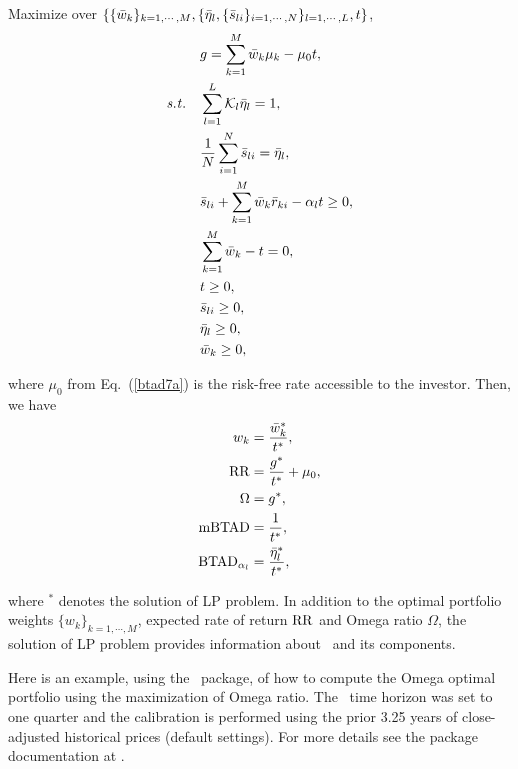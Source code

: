 \bigskip
\noindent Maximize over $\{\{{\bar w}_k\}_{k=1,\cdots,M}, \{ {\bar \eta}_l, \{ {\bar s}_{li} \}_{i=1,\cdots,N} \}_{l=1,\cdots,L}, t \}$,
\begin{subequations}\label{btad7}
\begin{align}
    &g = \sum_{k=1}^M \bw_k \mu_k - \mu_0 t, \label{btad7a} \\
    \st &\sum_{l=1}^L \cK_l \bbeta_l = 1, \label{btad7c} \\
    &\frac{1}{N}\sum_{i=1}^N \bs_{li} = \bbeta_l, \label{btad7b} \\
    &\bs_{li}  + \sum_{k=1}^M \bw_k \br_{ki} - \alpha_l t \geq 0, \label{btad7d} \\
    &\sum_{k=1}^M \bw_k - t = 0, \label{btad7e} \\
    &t \geq 0, \label{btad7h} \\
    &\bs_{li} \geq 0, \label{btad7g} \\
    &\bbeta_l \geq 0, \label{btad7i} \\
    &\bw_k \geq 0, \label{btad7f}
\end{align}
\end{subequations}

\noindent where $\mu_0$ from Eq.~(\ref{btad7a}) is the risk-free rate accessible to the investor.
Then, we have
\begin{subequations}\label{btad8}
\begin{align}
    w_k &= \frac{\bw_k^*}{t^*} , \label{btad8a} \\
    \RR &= \frac{g^*}{t^*} + \mu_0, \label{btad8c} \\
    \Omega &= g^*, \label{btad8b} \\
    \mBTAD &= \frac{1}{t^*}, \label{btad8d} \\
    \BTAD_{\alpha_l} &= \frac{\bbeta_l^*}{t^*}, \label{btad8e}
\end{align}
\end{subequations}

\noindent where $^*$ denotes the solution of LP problem.
In addition to the optimal portfolio weights $\{w_k\}_{k=1,\cdots,M}$, expected rate of return ${\rm RR}$ and
Omega ratio $\Omega$,
the solution of LP problem provides information about \mBTAD\ and its components.

\bigskip
\noindent Here is an example, using the \azapy\ package, of how to compute the Omega optimal portfolio using the maximization
of Omega ratio.
The \mBTAD\ time horizon was set to one quarter and the calibration is performed using the prior 3.25 years of
close-adjusted historical prices (default settings).
For more details see the package documentation at \azapydoc.

